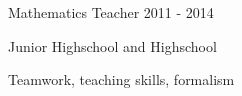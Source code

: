 \begin{cventries}


  \cventrysix
    {} %
    {Mathematics Teacher} %
    {} %
    {2011 - 2014} %
    {
      \begin{cvitems} %
        \item {Junior Highschool and Highschool}
      \end{cvitems}
    }%
    {Teamwork, teaching skills, formalism}



\end{cventries}
